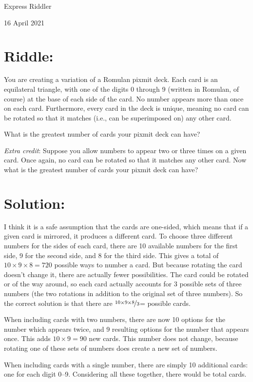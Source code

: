 \documentclass{article}
\begin{document}
\pagestyle{empty} %

\begin{center}
{\LARGE Express Riddler}

\vspace{0.15in}

{\Large 16 April 2021}
\end{center}


\section*{Riddle:}

You are creating a variation of a Romulan pixmit deck.
Each card is an equilateral triangle, with one of the digits 0 through 9 (written in Romulan, of course) at the base of each side of the card.
No number appears more than once on each card.
Furthermore, every card in the deck is unique, meaning no card can be rotated so that it matches (i.e., can be superimposed on) any other card.

What is the greatest number of cards your pixmit deck can have?

\textit{Extra credit}: Suppose you allow numbers to appear two or three times on a given card.
Once again, no card can be rotated so that it matches any other card.
Now what is the greatest number of cards your pixmit deck can have?



\section*{Solution:}

I think it is a safe assumption that the cards are one-sided, which means that if a given card is mirrored, it produces a different card.
To choose three different numbers for the sides of each card, there are 10 available numbers for the first side, 9 for the second side, and 8 for the third side.
This gives a total of $10\times9\times8=720$ possible ways to number a card.
But because rotating the card doesn't change it, there are actually fewer possibilities.
The card could be rotated  or  of the way around, so each card actually accounts for 3 possible sets of three numbers (the two rotations in addition to the original set of three numbers).
So the correct solution is that there are $\nicefrac{10\times9\times8}{3}$=
 possible cards.

When including cards with two numbers, there are now 10 options for the number which appears twice, and 9 resulting options for the number that appears once.
This adds $10\times9=90$ new cards.
This number does not change, because rotating one of these sets of numbers does create a new set of numbers.

When including cards with a single number, there are simply 10 additional cards: one for each digit 0--9.
Considering all these together, there would be
 total cards.
\end{document}
